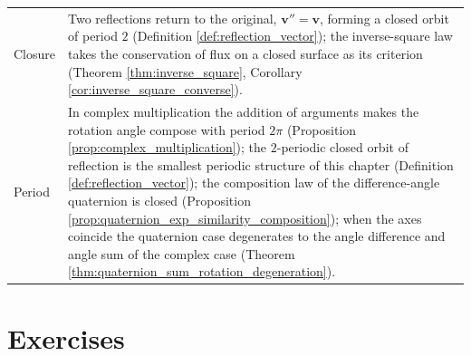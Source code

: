 \begin{longtable}{>{\raggedright\arraybackslash}p{3cm}>{\raggedright\arraybackslash}p{10.5cm}}
Closure & Two reflections return to the original, $\mathbf{v}''=\mathbf{v}$, forming a closed orbit of period $2$ (Definition \ref{def:reflection_vector}); the inverse-square law takes the conservation of flux on a closed surface as its criterion (Theorem \ref{thm:inverse_square}, Corollary \ref{cor:inverse_square_converse}). \\
Period & In complex multiplication the addition of arguments makes the rotation angle compose with period $2\pi$ (Proposition \ref{prop:complex_multiplication}); the $2$-periodic closed orbit of reflection is the smallest periodic structure of this chapter (Definition \ref{def:reflection_vector}); the composition law of the difference-angle quaternion is closed (Proposition \ref{prop:quaternion_exp_similarity_composition}); when the axes coincide the quaternion case degenerates to the angle difference and angle sum of the complex case (Theorem \ref{thm:quaternion_sum_rotation_degeneration}). \\
\bottomrule
\end{longtable}
\endgroup

\section*{Exercises}

